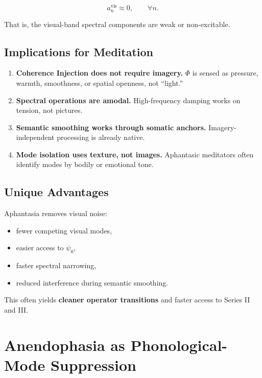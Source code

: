 \documentclass[12pt]{article}
\begin{document}
\[
a_n^{\text{vis}} \approx 0,
\qquad
\forall n.
\]

That is, the visual-band spectral components are weak or non-excitable.

\subsection{Implications for Meditation}

\begin{enumerate}
    \item \textbf{Coherence Injection does not require imagery.}  
          $\Phi$ is sensed as pressure, warmth, smoothness, or spatial openness,
          not “light.”

    \item \textbf{Spectral operations are amodal.}  
          High-frequency damping works on tension, not pictures.

    \item \textbf{Semantic smoothing works through somatic anchors.}  
          Imagery-independent processing is already native.

    \item \textbf{Mode isolation uses texture, not images.}  
          Aphantasic meditators often identify modes by bodily or emotional tone.
\end{enumerate}

\subsection{Unique Advantages}

Aphantasia removes visual noise:

\begin{itemize}
\item fewer competing visual modes,
\item easier access to $\psi_0$,
\item faster spectral narrowing,
\item reduced interference during semantic smoothing.
\end{itemize}

This often yields \textbf{cleaner operator transitions} and faster access to Series II and III.

\section{Anendophasia as Phonological-Mode Suppression}
\end{document}
